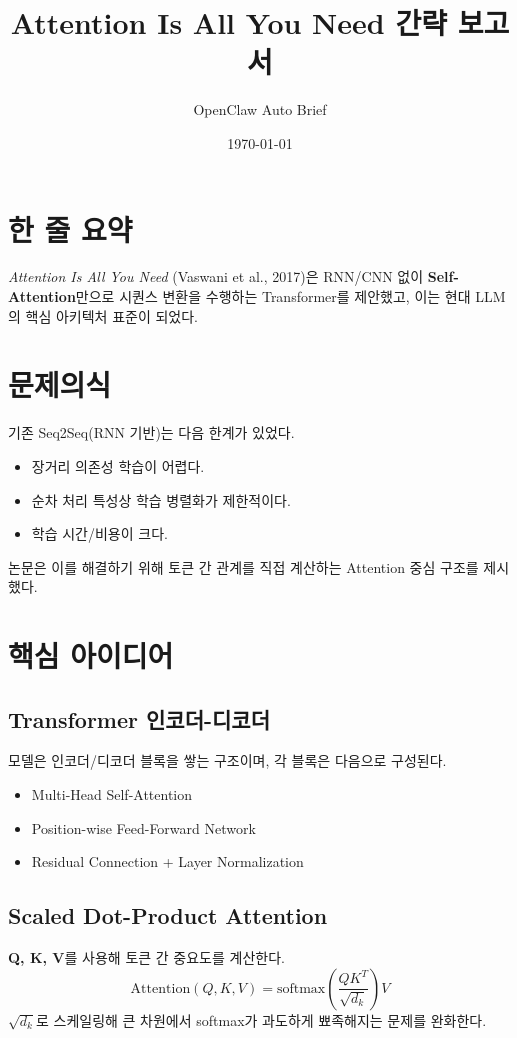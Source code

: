 \documentclass[11pt,a4paper]{article}
\title{Attention Is All You Need 간략 보고서}
\author{OpenClaw Auto Brief}
\date{\today}
\begin{document}
\maketitle

\section{한 줄 요약}
\textit{Attention Is All You Need} (Vaswani et al., 2017)은 RNN/CNN 없이 \textbf{Self-Attention}만으로 시퀀스 변환을 수행하는 Transformer를 제안했고,
이는 현대 LLM의 핵심 아키텍처 표준이 되었다.

\section{문제의식}
기존 Seq2Seq(RNN 기반)는 다음 한계가 있었다.
\begin{itemize}
  \item 장거리 의존성 학습이 어렵다.
  \item 순차 처리 특성상 학습 병렬화가 제한적이다.
  \item 학습 시간/비용이 크다.
\end{itemize}
논문은 이를 해결하기 위해 토큰 간 관계를 직접 계산하는 Attention 중심 구조를 제시했다.

\section{핵심 아이디어}
\subsection{Transformer 인코더-디코더}
모델은 인코더/디코더 블록을 쌓는 구조이며, 각 블록은 다음으로 구성된다.
\begin{itemize}
  \item Multi-Head Self-Attention
  \item Position-wise Feed-Forward Network
  \item Residual Connection + Layer Normalization
\end{itemize}

\subsection{Scaled Dot-Product Attention}
\textbf{Q, K, V}를 사용해 토큰 간 중요도를 계산한다.
\[
\mathrm{Attention}(Q,K,V)=\mathrm{softmax}\left(\frac{QK^T}{\sqrt{d_k}}\right)V
\]
$\sqrt{d_k}$로 스케일링해 큰 차원에서 softmax가 과도하게 뾰족해지는 문제를 완화한다.
\end{document}
